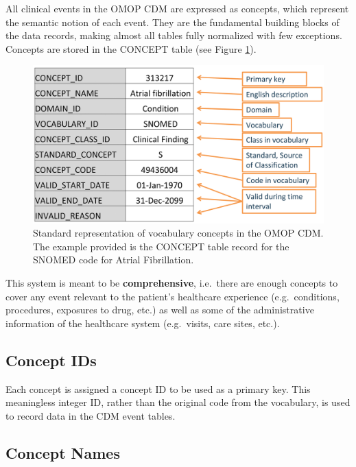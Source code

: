 \documentclass[11pt]{book}
\theoremstyle{definition}
\theoremstyle{definition}
\theoremstyle{definition}
\theoremstyle{remark}
\begin{document}
All clinical events in the OMOP CDM are expressed as concepts, which
represent the semantic notion of each event. They are the fundamental
building blocks of the data records, making almost all tables fully
normalized with few exceptions. Concepts are stored in the CONCEPT table
(see Figure \ref{fig:concept}). 

\begin{figure}

{\centering \includegraphics[width=0.9\linewidth]{images/StandardizedVocabularies/concept} 

}

\caption{Standard representation of vocabulary concepts in the OMOP CDM. The example provided is the CONCEPT table record for the SNOMED code for Atrial Fibrillation.}\label{fig:concept}
\end{figure}

This system is meant to be \textbf{comprehensive}, i.e.~there are enough
concepts to cover any event relevant to the patient's healthcare
experience (e.g.~conditions, procedures, exposures to drug, etc.) as
well as some of the administrative information of the healthcare system
(e.g.~visits, care sites, etc.).

\subsection{Concept IDs}\label{concept-ids}

Each concept is assigned a concept ID to be used as a primary key. This
meaningless integer ID, rather than the original code from the
vocabulary, is used to record data in the CDM event tables.

\subsection{Concept Names}\label{concept-names}
\end{document}
